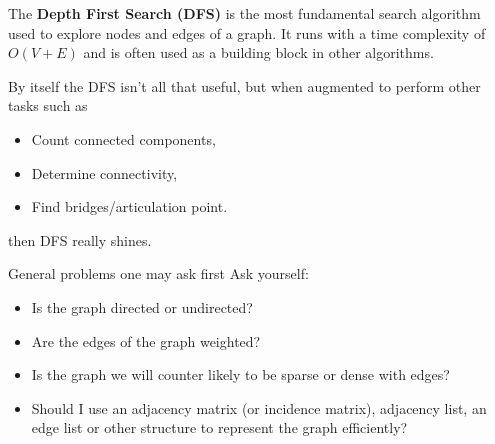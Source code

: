 \documentclass[xcolor=dvipsnames]{beamer}
\begin{document}
\begin{frame}
	The \textbf{Depth First Search (DFS)} is the most fundamental search algorithm used to explore nodes and edges of a 
	graph. It runs with a time complexity of $O(V+E)$ and is often used as a building block in other algorithms.

	By itself the DFS isn't all that useful, but when augmented to perform other tasks such as 
	\begin{itemize}
		\item Count connected components,
		\item Determine connectivity,
		\item Find bridges/articulation point.
	\end{itemize}
	then DFS really shines.
\end{frame}

\begin{frame}{General problems one may ask first}
Ask yourself:
	\begin{itemize}
		\item Is the graph directed or undirected?
		\item Are the edges of the graph weighted?
		\item Is the graph we will counter likely to be sparse or dense with edges?
		\item Should I use an adjacency matrix (or incidence matrix), adjacency list, an edge list or other structure to represent the graph efficiently?
	\end{itemize}
\end{frame}






\end{document}
